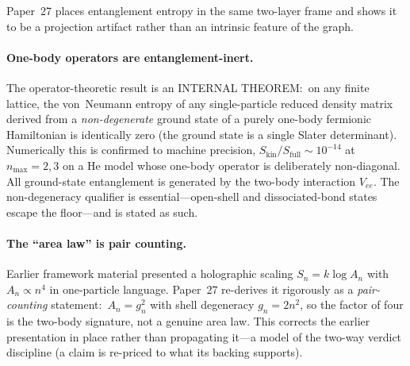\documentclass[aps,pra,twocolumn,superscriptaddress,longbibliography,nofootinbib]{revtex4-2}
\begin{document}
Paper~27 places entanglement entropy in the same two-layer frame and
shows it to be a projection artifact rather than an intrinsic feature of
the graph.

\paragraph{One-body operators are entanglement-inert.}
The operator-theoretic result is an INTERNAL THEOREM:\ on any finite
lattice, the von~Neumann entropy of any single-particle reduced density matrix derived
from a \emph{non-degenerate} ground state of a purely one-body fermionic
Hamiltonian is identically zero (the ground state is a single Slater
determinant).  Numerically this is confirmed to machine precision,
$S_{\mathrm{kin}}/S_{\mathrm{full}}\sim10^{-14}$ at $n_{\max}=2,3$ on a He
model whose one-body operator is deliberately non-diagonal.  All ground-state entanglement is generated by the
two-body interaction $V_{ee}$.  The non-degeneracy qualifier is
essential---open-shell and dissociated-bond states escape the floor---and
is stated as such.

\paragraph{The ``area law'' is pair counting.}
Earlier framework material presented a holographic scaling
$S_n=k\log A_n$ with $A_n\propto n^4$ in one-particle language.  Paper~27
re-derives it rigorously as a \emph{pair-counting} statement:\
$A_n=g_n^2$ with shell degeneracy $g_n=2n^2$, so the factor of four is
the two-body signature, not a genuine area law.  This corrects the
earlier presentation in place rather than propagating it---a model of the
two-way verdict discipline (a claim is re-priced to what its backing
supports).
\end{document}
